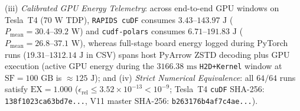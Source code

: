 \documentclass[10pt,a4paper]{article}
\begin{document}
(iii) \emph{Calibrated GPU Energy Telemetry}: across end-to-end GPU windows on Tesla~T4 ($70\text{ W}$ TDP), \texttt{RAPIDS cuDF} consumes $3.43\text{--}143.97\text{ J}$ ($P_{\text{mean}}=30.4\text{--}39.2\text{ W}$) and \texttt{cudf-polars} consumes $6.71\text{--}191.83\text{ J}$ ($P_{\text{mean}}=26.8\text{--}37.1\text{ W}$), whereas full-stage board energy logged during PyTorch runs ($19.31\text{--}1312.14\text{ J}$ in CSV) spans host PyArrow ZSTD decoding plus GPU execution (active GPU energy during the $3166.38\text{ ms}$ \texttt{H2D+Kernel} window at $\text{SF}=100\text{ GB}$ is $\approx 125\text{ J}$); and
(iv) \emph{Strict Numerical Equivalence}: all $64/64$ runs satisfy $\text{EX}=1.000$ ($\epsilon_{\text{rel}} \le 3.52 \times 10^{-13} < 10^{-9}$; Tesla~T4 \texttt{cuDF} SHA-256: \texttt{138f1023ca63bd7e...}, V11 master SHA-256: \texttt{b263176b4af7c4ae...}).
\end{document}
